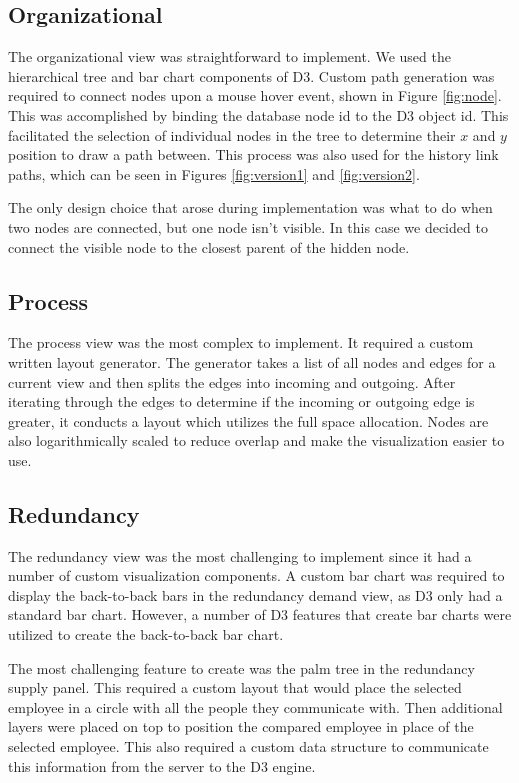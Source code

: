 \documentclass[journal]{vgtc}                %
\begin{document}
\subsection{Organizational}
The organizational view was straightforward to implement. We used the hierarchical tree and bar chart components of D3.  Custom path generation was required to connect nodes upon a mouse hover event, shown in Figure \ref{fig:node}.  This was accomplished by binding the database node id to the D3 object id.  This facilitated the selection of individual nodes in the tree to determine their $x$ and $y$ position to draw a path between.  This process was also used for the history link paths, which can be seen in Figures \ref{fig:version1} and \ref{fig:version2}.

The only design choice that arose during implementation was what to do when two nodes are connected, but one node isn't visible.  In this case we decided to connect the visible node to the closest parent of the hidden node.

\subsection{Process}
The process view was the most complex to implement.  It required a custom written layout generator.  The generator takes a list of all nodes and edges for a current view and then splits the edges into incoming and outgoing.  After iterating through the edges to determine if the incoming or outgoing edge is greater, it conducts a layout which utilizes the full space allocation.  Nodes are also logarithmically scaled to reduce overlap and make the visualization easier to use.

\subsection{Redundancy}
The redundancy view was the most challenging to implement since it had a number of custom visualization components.  A custom bar chart was required to display the back-to-back bars in the redundancy demand view, as D3 only had a standard bar chart.  However, a number of D3 features that create bar charts were utilized to create the back-to-back bar chart.

The most challenging feature to create was the palm tree in the redundancy supply panel.  This required a custom layout that would place the selected employee in a circle with all the people they communicate with.  Then additional layers were placed on top to position the compared employee in place of the selected employee.  This also required a custom data structure to communicate this information from the server to the D3 engine.
\end{document}
